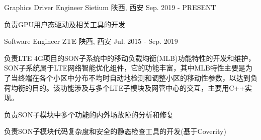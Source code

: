 
\begin{cventries}
  \cventry
    {Graphics Driver Engineer} %
    {Sietium} %
    {陕西, 西安} %
    {Sep. 2019 - PRESENT} %
    {
      \begin{cvitems} %
        \item {负责GPU用户态驱动及相关工具的开发}
      \end{cvitems}
    }

  \cventry
    {Software Engineer} %
    {ZTE} %
    {陕西, 西安} %
    {Jul. 2015 - Sep. 2019} %
    {
      \begin{cvitems} %
        \item {负责LTE 4G项目的SON子系统中的移动负载均衡(MLB)功能特性的开发和维护，SON子系统属于LTE网络智能优化组件，它的功能丰富，其中MLB特性主要是为了当终端在各个小区中分布不均时自动地检测和调整小区的移动性参数，以达到负荷均衡的目的。该功能涉及与多个LTE子模块及网管中心的交互，主要用C++实现。}
		\item {负责SON子模块中多个功能的内外场故障的分析和修复}
        \item {负责SON子模块代码复杂度和安全的静态检查工具的开发(基于Coverity)}
      \end{cvitems}
    }
\end{cventries}

